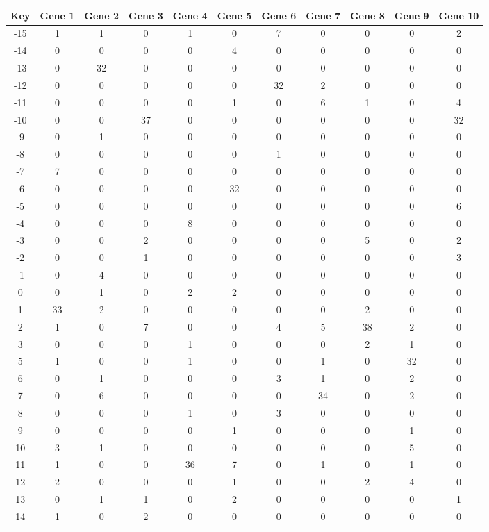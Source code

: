 \begin{tabular}{|c|c|c|c|c|c|c|c|c|c|c|}
\hline
Key & Gene 1 & Gene 2 & Gene 3 & Gene 4 & Gene 5 & Gene 6 & Gene 7 & Gene 8 & Gene 9 & Gene 10 \\
\hline
-15 & 1 & 1 & 0 & 1 & 0 & 7 & 0 & 0 & 0 & 2 \\
-14 & 0 & 0 & 0 & 0 & 4 & 0 & 0 & 0 & 0 & 0 \\
-13 & 0 & 32 & 0 & 0 & 0 & 0 & 0 & 0 & 0 & 0 \\
-12 & 0 & 0 & 0 & 0 & 0 & 32 & 2 & 0 & 0 & 0 \\
-11 & 0 & 0 & 0 & 0 & 1 & 0 & 6 & 1 & 0 & 4 \\
-10 & 0 & 0 & 37 & 0 & 0 & 0 & 0 & 0 & 0 & 32 \\
-9 & 0 & 1 & 0 & 0 & 0 & 0 & 0 & 0 & 0 & 0 \\
-8 & 0 & 0 & 0 & 0 & 0 & 1 & 0 & 0 & 0 & 0 \\
-7 & 7 & 0 & 0 & 0 & 0 & 0 & 0 & 0 & 0 & 0 \\
-6 & 0 & 0 & 0 & 0 & 32 & 0 & 0 & 0 & 0 & 0 \\
-5 & 0 & 0 & 0 & 0 & 0 & 0 & 0 & 0 & 0 & 6 \\
-4 & 0 & 0 & 0 & 8 & 0 & 0 & 0 & 0 & 0 & 0 \\
-3 & 0 & 0 & 2 & 0 & 0 & 0 & 0 & 5 & 0 & 2 \\
-2 & 0 & 0 & 1 & 0 & 0 & 0 & 0 & 0 & 0 & 3 \\
-1 & 0 & 4 & 0 & 0 & 0 & 0 & 0 & 0 & 0 & 0 \\
0 & 0 & 1 & 0 & 2 & 2 & 0 & 0 & 0 & 0 & 0 \\
1 & 33 & 2 & 0 & 0 & 0 & 0 & 0 & 2 & 0 & 0 \\
2 & 1 & 0 & 7 & 0 & 0 & 4 & 5 & 38 & 2 & 0 \\
3 & 0 & 0 & 0 & 1 & 0 & 0 & 0 & 2 & 1 & 0 \\
5 & 1 & 0 & 0 & 1 & 0 & 0 & 1 & 0 & 32 & 0 \\
6 & 0 & 1 & 0 & 0 & 0 & 3 & 1 & 0 & 2 & 0 \\
7 & 0 & 6 & 0 & 0 & 0 & 0 & 34 & 0 & 2 & 0 \\
8 & 0 & 0 & 0 & 1 & 0 & 3 & 0 & 0 & 0 & 0 \\
9 & 0 & 0 & 0 & 0 & 1 & 0 & 0 & 0 & 1 & 0 \\
10 & 3 & 1 & 0 & 0 & 0 & 0 & 0 & 0 & 5 & 0 \\
11 & 1 & 0 & 0 & 36 & 7 & 0 & 1 & 0 & 1 & 0 \\
12 & 2 & 0 & 0 & 0 & 1 & 0 & 0 & 2 & 4 & 0 \\
13 & 0 & 1 & 1 & 0 & 2 & 0 & 0 & 0 & 0 & 1 \\
14 & 1 & 0 & 2 & 0 & 0 & 0 & 0 & 0 & 0 & 0 \\
\hline
\end{tabular}